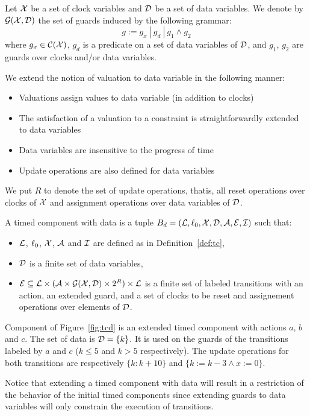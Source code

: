 \begin{definition}
  Let $\mathcal{X}$ be a set of clock variables and $\mathcal{D}$ be a set of
  data variables. We denote by $\mathcal{G(X,D)}$ the set of guards induced
  by the following grammar:
  \begin{displaymath}
    g:=g_x \ | \ g_d \ | \ g_1\wedge g_2
  \end{displaymath}
  where $g_x\in\mathcal{C(X)}$, $g_d$ is a predicate on a set of data variables
  of $\mathcal{D}$, and $g_1$, $g_2$ are guards over clocks and/or data variables.
\end{definition}

We extend the notion of valuation to data variable in the following manner:
\begin{itemize}
  \item Valuations assign values to data variable (in addition to clocks)
  \item The satisfaction of a valuation to a constraint is straightforwardly 
    extended to data variables
  \item Data variables are insensitive to the progress of time
  \item Update operations are also defined for data variables 
\end{itemize}
We put $R$ to denote the set of update operations, thatis, 
all reset operations over clocks of $\mathcal{X}$ and 
assignment operations over data variables of $\mathcal{D}$. 

\begin{definition}\label{def:tce}
  A timed component with data is a tuple 
  $B_d=(\mathcal{L},\ell_0,\mathcal{X},\mathcal{D},\mathcal{A},\mathcal{E},\mathcal{I})$ such that:
  \begin{itemize}
    \item $\mathcal{L}$, $\ell_0$, $\mathcal{X}$, $\mathcal{A}$ and $\mathcal{I}$ are defined as
      in Definition~\ref{def:tc},
    \item $\mathcal{D}$ is a finite set of data variables,
    \item $\mathcal{E}\subseteq\mathcal{L}\times(\mathcal{A}\times\mathcal{G(X,D)}\times2^{R})\times\mathcal{L}$
    is a finite set of labeled transitions with an action, an extended guard, 
      and a set of clocks to be reset and assignement operations over elements
      of $\mathcal{D}$. 
  \end{itemize}
\end{definition}


\begin{example}
  Component of Figure~\ref{fig:tcd} is an extended timed component with actions $a$, $b$ and $c$.
  The set of data is $\mathcal{D}=\{k\}$. It is used on the guards of the transitions labeled by
  $a$ and $c$ ($k\le 5$ and $k>5$ respectively). The update operations for both transitions
  are respectively $\{k:k+10\}$ and $\{k:=k-3\wedge x:=0\}$.
\end{example}
\begin{remark}
  Notice that extending a timed component with data will result in a restriction
  of the behavior of the initial timed components since extending guards to data
  variables will only constrain the execution of transitions.
\end{remark}

